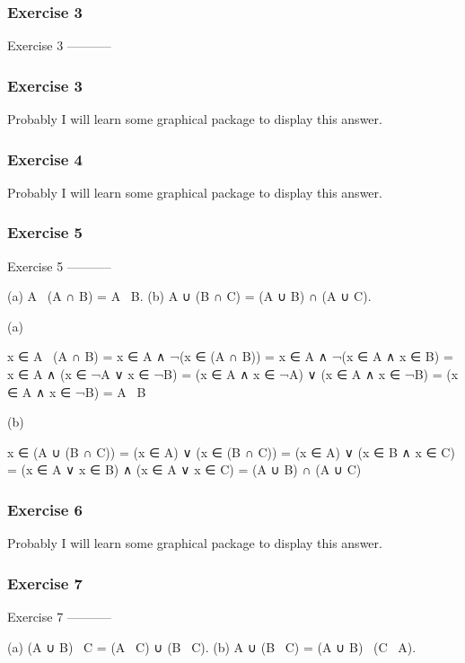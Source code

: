 \subsubsection{Exercise 3}
Exercise 3
-----------


\subsubsection{Exercise 3}
Probably I will learn some graphical package to display this answer.
\subsubsection{Exercise 4}
Probably I will learn some graphical package to display this answer.

\subsubsection{Exercise 5}
Exercise 5
-----------

    (a) A \ (A ∩ B) = A \ B.
    (b) A ∪ (B ∩ C) = (A ∪ B) ∩ (A ∪ C).

(a)

    x ∈ A \ (A ∩ B)
    = x ∈ A ∧ ¬(x ∈ (A ∩ B))
    = x ∈ A ∧ ¬(x ∈ A ∧ x ∈ B)
    = x ∈ A ∧ (x ∈ ¬A ∨ x ∈ ¬B)
    = (x ∈ A ∧ x ∈ ¬A) ∨ (x ∈ A ∧ x ∈ ¬B)
    = (x ∈ A ∧ x ∈ ¬B)
    = A \ B

(b)

    x ∈ (A ∪ (B ∩ C))
    = (x ∈ A) ∨ (x ∈ (B ∩ C))
    = (x ∈ A) ∨ (x ∈ B ∧ x ∈ C)
    = (x ∈ A ∨ x ∈ B) ∧ (x ∈ A ∨ x ∈ C)
    = (A ∪ B) ∩ (A ∪ C)

\subsubsection{Exercise 6}
Probably I will learn some graphical package to display this answer.
\subsubsection{Exercise 7}
Exercise 7
-----------

    (a) (A ∪ B) \ C = (A \ C) ∪ (B \ C).
    (b) A ∪ (B \ C) = (A ∪ B) \ (C \ A).

